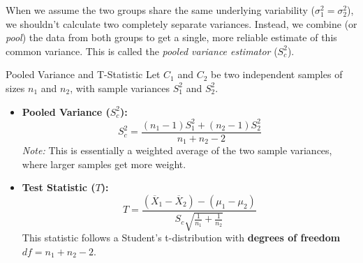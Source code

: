 When we assume the two groups share the same underlying variability ($\sigma_1^2 = \sigma_2^2$), we shouldn't calculate two completely separate variances. Instead, we combine (or \textit{pool}) the data from both groups to get a single, more reliable estimate of this common variance. This is called the \textit{pooled variance estimator} ($S_c^2$).

\begin{defbox}{Pooled Variance and T-Statistic}
Let $C_1$ and $C_2$ be two independent samples of sizes $n_1$ and $n_2$, with sample variances $S_1^2$ and $S_2^2$.

\begin{itemize}
    \item \textbf{Pooled Variance ($S_c^2$):}
    \begin{equation}
        S_{c}^{2} = \frac{(n_{1}-1)S_{1}^{2} + (n_{2}-1)S_{2}^{2}}{n_{1}+n_{2}-2} 
    \end{equation} 
    \textit{Note:} This is essentially a weighted average of the two sample variances, where larger samples get more weight.

    \vs
    \item \textbf{Test Statistic ($T$):}
    \begin{equation}
        T = \frac{(\overline{X}_{1}-\overline{X}_{2}) - (\mu_{1}-\mu_{2})}{S_{c}\sqrt{\frac{1}{n_{1}}+\frac{1}{n_{2}}}}
    \end{equation} 
    This statistic follows a Student's t-distribution with \textbf{degrees of freedom} $df = n_{1}+n_{2}-2$.
\end{itemize}
\end{defbox}

